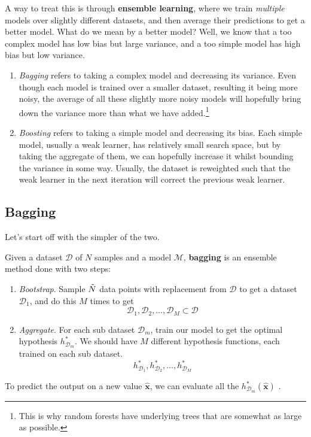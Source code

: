 \documentclass{article}
\begin{document}
    A way to treat this is through \textbf{ensemble learning}, where we train \textit{multiple} models over slightly different datasets, and then average their predictions to get a better model. What do we mean by a better model? Well, we know that a too complex model has low bias but large variance, and a too simple model has high bias but low variance. 

    \begin{enumerate}
      \item \textit{Bagging} refers to taking a complex model and decreasing its variance. Even though each model is trained over a smaller dataset, resulting it being more noisy, the average of all these slightly more noisy models will hopefully bring down the variance more than what we have added.\footnote{This is why random forests have underlying trees that are somewhat as large as possible.} 
      \item \textit{Boosting} refers to taking a simple model and decreasing its bias. Each simple model, usually a weak learner, has relatively small search space, but by taking the aggregate of them, we can hopefully increase it whilst bounding the variance in some way. Usually, the dataset is reweighted such that the weak learner in the next iteration will correct the previous weak learner. 
    \end{enumerate}

  \subsection{Bagging}

    Let's start off with the simpler of the two. 

    \begin{definition}
      Given a dataset $\mathcal{D}$ of $N$ samples and a model $\mathcal{M}$, \textbf{bagging} is an ensemble method done with two steps: 
      \begin{enumerate}
        \item \textit{Bootstrap}. Sample $\Tilde{N}$ data points with replacement from $\mathcal{D}$ to get a dataset $\mathcal{D}_1$, and do this $M$ times to get 
        \[\mathcal{D}_1, \mathcal{D}_2, \ldots, \mathcal{D}_M \subset \mathcal{D}\]
        \item \textit{Aggregate}. For each sub dataset $\mathcal{D}_m$, train our model to get the optimal hypothesis $h_{\mathcal{D}_m}^\ast$. We should have $M$ different hypothesis functions, each trained on each sub dataset. 
        \[h_{\mathcal{D}_1}^\ast, h_{\mathcal{D}_2}^\ast, \ldots, h_{\mathcal{D}_M}^\ast\]
      \end{enumerate}
      To predict the output on a new value $\hat{\mathbf{x}}$, we can evaluate all the $h_{\mathcal{D}_m}^\ast (\hat{\mathbf{x}})$ .
    \end{definition}
\end{document}
